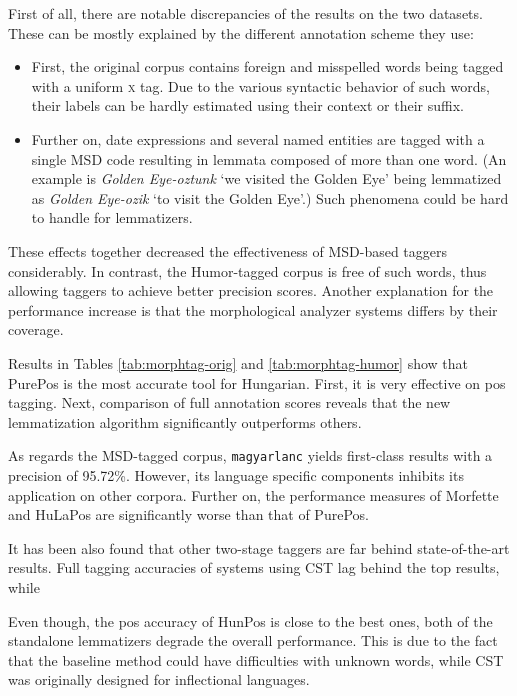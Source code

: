 First of all, there are notable discrepancies of the results on the two datasets. These can be mostly explained by the different annotation scheme they use:
\begin{itemize}
  \item First, the original corpus contains foreign and misspelled words being tagged with a uniform \textsc{x} tag. Due to the various syntactic behavior of such words, their labels can be hardly estimated using their context or their suffix.
  \item Further on, date expressions and several named entities are tagged with a single MSD code resulting in lemmata composed of more than one word. (An example is \emph{Golden Eye-oztunk} `we visited the Golden Eye’ being lemmatized as \emph{Golden Eye-ozik} `to visit the Golden Eye’.) 
  Such phenomena could be hard to handle for lemmatizers.
\end{itemize}

These effects together decreased the effectiveness of MSD-based taggers considerably. 
In contrast, the Humor-tagged corpus is free of such words, thus allowing taggers to achieve better precision scores. 
Another explanation for the performance increase is that the morphological analyzer systems differs by their coverage.

Results in Tables \ref{tab:morphtag-orig} and \ref{tab:morphtag-humor} show that PurePos is the most accurate tool for Hungarian. 
First, it is very effective on \gls{pos} tagging. %
Next, comparison of full annotation scores reveals that the new lemmatization algorithm significantly outperforms others. 

As regards the MSD-tagged corpus, \texttt{magyarlanc} yields first-class results with a precision of 95.72\%. 
However, its language specific components inhibits its application on other corpora. 
Further on, the performance measures of Morfette and HuLaPos are significantly worse than that of PurePos.  

It has been also found that other two-stage taggers are far behind state-of-the-art results. 
Full tagging accuracies of systems using CST lag behind the top results, while 

Even though, the \gls{pos} accuracy of HunPos is close to the best ones, both of the standalone lemmatizers degrade the overall performance. 
This is due to the fact that the baseline method could have difficulties with unknown words, while CST was originally designed for inflectional languages. 

